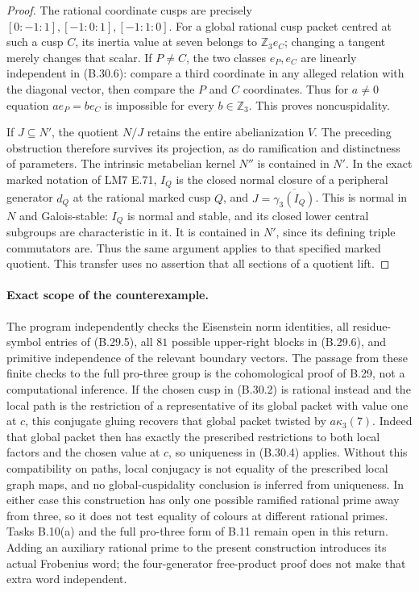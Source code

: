 \begin{proof}
The rational coordinate cusps are precisely
$[0:-1:1],[-1:0:1],[-1:1:0]$.
For a global rational cusp packet centred at such a cusp
$C$, its inertia value at seven belongs to
$\mathbb Z_3e_C$; changing a tangent merely changes that
scalar.  If $P\ne C$, the two classes $e_P,e_C$ are linearly
independent in (B.30.6): compare a third coordinate in
any alleged relation with the diagonal vector, then compare
the $P$ and $C$ coordinates.  Thus for $a\ne0$ equation
$ae_P=be_C$ is impossible for every $b\in\mathbb Z_3$.
This proves noncuspidality.

If $J\subseteq N'$, the quotient $N/J$ retains the entire
abelianization $V$.  The preceding obstruction therefore
survives its projection, as do ramification and distinctness
of parameters.  The intrinsic metabelian kernel $N''$ is
contained in $N'$.  In the exact marked notation of
LM7 E.71, $I_Q$ is the closed normal closure of a peripheral
generator $d_Q$ at the rational marked cusp $Q$, and
$J=\overline{\gamma_3(I_Q)}$.
This is normal in $N$ and Galois-stable: $I_Q$ is normal
and stable, and its closed lower central subgroups are
characteristic in it.  It is contained in $N'$, since its
defining triple commutators are.  Thus the same argument
applies to that specified marked quotient.
This transfer uses no assertion that
all sections of a quotient lift.
\end{proof}

\paragraph{Exact scope of the counterexample.}
The program  independently
checks the Eisenstein norm identities, all residue-symbol
entries of (B.29.5), all $81$ possible upper-right blocks
in (B.29.6), and primitive independence of the relevant
boundary vectors.  The passage from these finite checks
to the full pro-three group is the cohomological proof
of B.29, not a computational inference.
If the chosen cusp in (B.30.2) is rational instead and the
local path is the restriction of a representative of its
global packet with value one at $c$, this conjugate gluing
recovers that global packet twisted by $a\kappa_3(7)$.
Indeed that global packet then has exactly the prescribed
restrictions to both local factors and the chosen value
at $c$, so uniqueness in (B.30.4) applies.
Without this compatibility on paths, local conjugacy is
not equality of the prescribed local graph maps, and no
global-cuspidality conclusion is inferred from uniqueness.
In either case this construction has only one possible
ramified rational prime away from three, so it does not
test equality of colours at different rational primes.
Tasks B.10(a) and the full pro-three form of B.11 remain
open in this return.  Adding an auxiliary rational prime
to the present construction introduces its actual
Frobenius word; the four-generator free-product proof
does not make that extra word independent.
